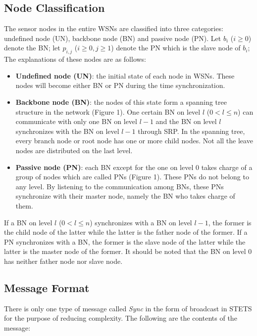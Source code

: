\documentclass[runningheads,a4paper]{llncs}
\begin{document}
\subsection{Node Classification}
The sensor nodes in the entire WSNs are classified into three categories: undefined node (UN), backbone node (BN) and passive node (PN). Let $ b_{i}$ ($i\geq 0$) denote the BN; let $ p_{i,j}$ ($i\geq 0,j\geq 1$) denote the PN which is the slave node of $ b_{i}$; The explanations of these nodes are as follows:
\begin{itemize}
\item \textbf{Undefined node (UN)}: the initial state of each node in WSNs. These nodes will become either BN or PN during the time synchronization.
\item \textbf{Backbone node (BN)}: the nodes of this state form a spanning tree structure in the network (Figure 1). One certain BN on level $l$ ($0<l\leq n$) can communicate with only one BN on level $l-1$ and the BN on level $l$ synchronizes with the BN on level $l-1$ through SRP. In the spanning tree, every branch node or root node has one or more child nodes. Not all the leave nodes are distributed on the last level.
\item \textbf{Passive node (PN)}: each BN except for the one on level 0 takes charge of a group of nodes which are called PNs (Figure 1). These PNs do not belong to any level. By listening to the communication among BNs, these PNs synchronize with their master node, namely the BN who takes charge of them.
\end{itemize}


If a BN on level $l$ ($0<l\leq n$) synchronizes with a BN on level $l-1$, the former is the child node of the latter while the latter is the father node of the former. If a PN synchronizes with a BN, the former is the slave node of the latter while the latter is the master node of the former. It should be noted that the BN on level 0 has neither father node nor slave node.

\subsection{Message Format}


There is only one type of message called \textit{Sync} in the form of broadcast in STETS for the purpose of reducing complexity. The following are the contents of the message:
\end{document}
